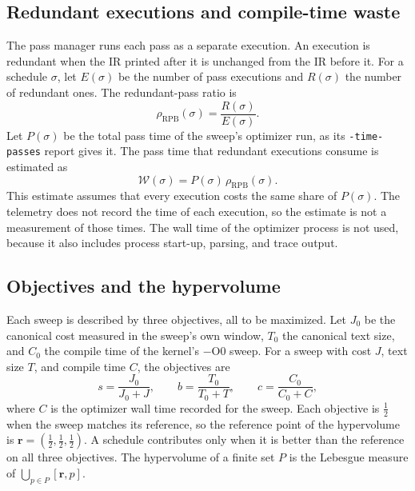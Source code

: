 \subsection{Redundant executions and compile-time waste}

The pass manager runs each pass as a separate execution. An execution is redundant when the IR printed after it is unchanged
from the IR before it. For a schedule $\sigma$, let $E(\sigma)$ be the number of pass executions and $R(\sigma)$ the number of
redundant ones. The redundant-pass ratio is
\begin{equation}\label{eq:rpb}
  \rho_{\mathrm{RPB}}(\sigma)=\frac{R(\sigma)}{E(\sigma)}.
\end{equation}
Let $P(\sigma)$ be the total pass time of the sweep's optimizer run, as its \texttt{-time-passes} report gives it. The pass
time that redundant executions consume is estimated as
\begin{equation}\label{eq:waste}
  \mathcal{W}(\sigma)=P(\sigma)\,\rho_{\mathrm{RPB}}(\sigma).
\end{equation}
This estimate assumes that every execution costs the same share of $P(\sigma)$. The telemetry does not record the time of each
execution, so the estimate is not a measurement of those times. The wall time of the optimizer process is not used, because it
also includes process start-up, parsing, and trace output.

\subsection{Objectives and the hypervolume}

Each sweep is described by three objectives, all to be maximized. Let $J_0$ be the canonical cost measured in the sweep's own
window, $T_0$ the canonical text size, and $C_0$ the compile time of the kernel's $-\mathrm{O}0$ sweep. For a sweep with cost
$J$, text size $T$, and compile time $C$, the objectives are
\begin{equation}\label{eq:objectives}
  s=\frac{J_0}{J_0+J},\qquad b=\frac{T_0}{T_0+T},\qquad c=\frac{C_0}{C_0+C},
\end{equation}
where $C$ is the optimizer wall time recorded for the sweep. Each objective is $\tfrac12$ when the sweep matches its reference,
so the reference point of the hypervolume is $\mathbf{r}=(\tfrac12,\tfrac12,\tfrac12)$. A schedule contributes only when it is
better than the reference on all three objectives. The hypervolume of a finite set $P$ is the Lebesgue measure of
$\bigcup_{p\in P}[\mathbf{r},p]$.

